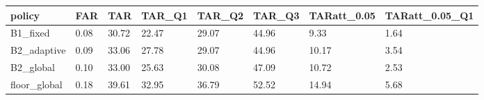 \begin{tabular}{llllllll}
\hline
policy & FAR & TAR & TAR\_Q1 & TAR\_Q2 & TAR\_Q3 & TARatt\_0.05 & TARatt\_0.05\_Q1 \\
\hline
B1\_fixed & 0.08 & 30.72 & 22.47 & 29.07 & 44.96 & 9.33 & 1.64 \\
B2\_adaptive & 0.09 & 33.06 & 27.78 & 29.07 & 44.96 & 10.17 & 3.54 \\
B2\_global & 0.10 & 33.00 & 25.63 & 30.08 & 47.09 & 10.72 & 2.53 \\
floor\_global & 0.18 & 39.61 & 32.95 & 36.79 & 52.52 & 14.94 & 5.68 \\
\hline
\end{tabular}
